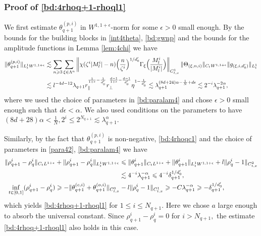 \documentclass[UTF-8,reqno]{amsart}
\numberwithin{equation}{section}
\theoremstyle{definition}
\def\({{\Big(}}
\def\){{\Big)}}
\newcommand{\norm}[1]{\left\|#1\right\|}
\def\geq{\geqslant}
\def\leq{\leqslant}
\def\({{\Big(}}
\def\){{\Big)}}
\def\geq{\geqslant}
\def\leq{\leqslant}
\begin{document}
\subsubsection{Proof of   \eqref{bd:4rhoq+1-rhoql1}}
We first estimate $\theta_{q+1}^{(p,i)}$ in $W^{1,1+\epsilon}$-norm for some $\epsilon>0$ small enough. By the bounds for the building blocks in \eqref{int4theta}, \eqref{bd:gwnp}  and the bounds for the amplitude functions in Lemma \ref{lem:4chi} we have
\begin{align*}
\|\theta_{q+1}^{(p,i)}\|_{L^1_tW^{1,1+\epsilon}}&\lesssim\sum_{n\geq3}\sum_{\xi\in\Lambda^{n}}\norm{\chi(\zeta^{i}|M^{i}_l|-n)\(\frac{n}{\zeta^{i}}\)^{1/d_0'}\Gamma_{\xi}\(\frac{M^{i}_l}{|M^{i}_l|}\)}_{C_{t,x}^1}\|\Theta_{(\xi,n,i)} \|_{C_tW^{1,1+\epsilon}}\|g_{(\xi,i,d_0')}\|_{L_t^1}\notag\\ 
&\lesssim l^{-4d-12}\lambda_{q+1}r_\parallel^{\frac1{1+\epsilon}-\frac{1}{d_0'}}r_\perp^{\frac{d-1}{1+\epsilon}-\frac{d-1}{d_0'}}\eta^{1-\frac1{d_0'}}%
\lesssim\lambda_{q+1}^{(8d+24)\alpha-\frac1N+d\epsilon}\lesssim2^{-i}\lambda_{q+1}^{-2\alpha} ,
\end{align*}
where we used the choice of parameters in \eqref{bd:paralam4} and  chose $\epsilon>0$ small enough such that $d\epsilon<\alpha$. We also used  conditions on the parameters to have $(8d+28)\alpha<\frac1N,2^i\leq2^{N_{q+1}}\lesssim\lambda_{q+1}^{\alpha}$. 

 
Similarly, by the fact that $\theta_{q+1}^{(p,i)}$ is non-negative, \eqref{bd:4rhoqc1} and the choice of parameters in \eqref{para42}, \eqref{bd:paralam4}  we have
\begin{align}
\|\rho^{i}_{q+1}-\rho^{i}_q\|_{C_tL^{1+\epsilon}}&+\|\rho^{i}_{q+1}-\rho^{i}_q\|_{L_t^1W^{1,1+\epsilon}}
\leq\|\theta^{i}_{q+1}\|_{C_tL^{1+\epsilon}}+\|\theta^{i}_{q+1}\|_{L_t^1W^{1,1+\epsilon}}+ l\|\rho_q^i-1\|_{C_{t,x}^2}\notag\\
&\qquad\qquad\qquad\qquad\qquad\lesssim4^{-i}\lambda_{q+1}^{-\alpha}\leq 4^{-i}\delta_{q+1}^{1/d_0'},\notag\\
    \inf_{t\in [0,1]}(\rho^{i}_{q+1} - \rho^{i}_q)&\geq-\|\theta_{q+1}^{(c,i)}+\theta
_{q+1}^{(o,i)}\|_{C_{t,x}^0} -l\|\rho_q^i-1\|_{C_{t,x}^1}\geq -C\lambda_{q+1}^{-\alpha} \geq -\delta_{q+1}^{1/d_0'},\notag
\end{align}
which yields \eqref{bd:4rhoq+1-rhoql1} for $1\leq i\leq N_{q+1}$.  Here we chose $a$ large enough to absorb the universal constant. Since
$
\rho_{q+1}^i-\rho_q^i=0
$
for
$
i>N_{q+1},
$
the estimate \eqref{bd:4rhoq+1-rhoql1} also holds in this case.
\end{document}
